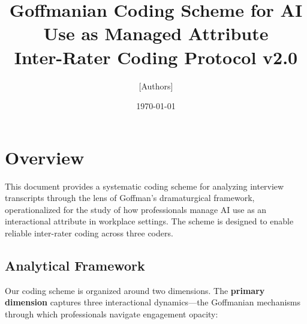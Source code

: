 \documentclass[11pt]{article}
\title{Goffmanian Coding Scheme for AI Use as Managed Attribute\\[0.5em]\large Inter-Rater Coding Protocol v2.0}
\author{[Authors]}
\date{\today}
\begin{document}
\maketitle

\tableofcontents
\newpage

\section{Overview}

This document provides a systematic coding scheme for analyzing interview transcripts through the lens of Goffman's dramaturgical framework, operationalized for the study of how professionals manage AI use as an interactional attribute in workplace settings. The scheme is designed to enable reliable inter-rater coding across three coders.

\subsection{Analytical Framework}

Our coding scheme is organized around two dimensions. The \textbf{primary dimension} captures three interactional dynamics---the Goffmanian mechanisms through which professionals navigate engagement opacity:
\end{document}
